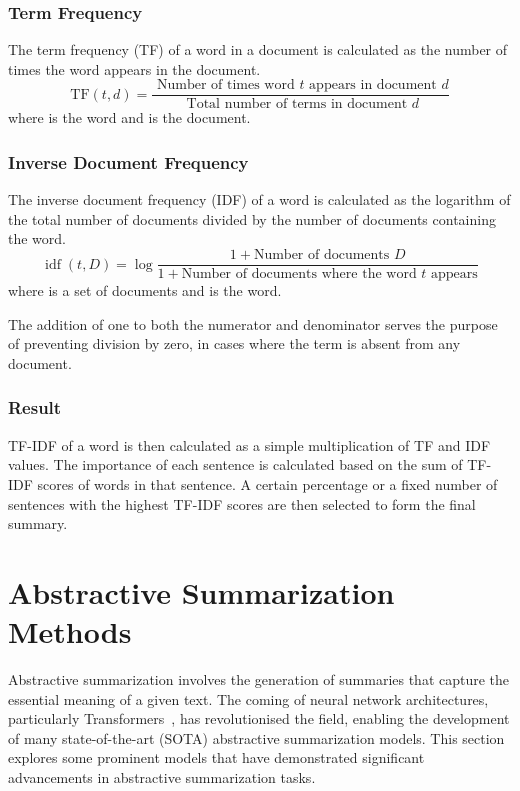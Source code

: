 \documentclass[english, ba, kiv, he, iso690numb, pdf, viewonly]{fasthesis}
\begin{document}
\subsubsection{Term Frequency}
The term frequency (TF) of a word in a document is calculated as the number of times the word appears in the document. 
$$
\mathrm{TF}(t, d)=\frac{\text { Number of times word } t \text { appears in document } d}{\text { Total number of terms in document } d}
$$
where  is the word and  is the document.

\subsubsection{Inverse Document Frequency}
The inverse document frequency (IDF) of a word is calculated as the logarithm of the total number of documents divided by the number of documents containing the word.
$$
\operatorname{idf}(t, D)=\log \frac{1 + \text{Number of documents } D}{1 + \text{Number of documents where the word } t \text{ appears}}
$$
where  is a set of documents and  is the word.

The addition of one to both the numerator and denominator serves the purpose of preventing division by zero, in cases where the term  is absent from any document.

\subsubsection{Result}
TF-IDF of a word  is then calculated as a simple multiplication of TF and IDF values. 
The importance of each sentence is calculated based on the sum of TF-IDF scores of words in that sentence. A certain percentage or a fixed number of sentences with the highest TF-IDF scores are then selected to form the final summary.

\section{Abstractive Summarization Methods}
Abstractive summarization involves the generation of summaries that capture the essential meaning of a given text. The coming of neural network architectures, particularly Transformers~\cite{vaswani2023attention}, has revolutionised the field, enabling the development of many state-of-the-art (SOTA) abstractive summarization models. This section explores some prominent models that have demonstrated significant advancements in abstractive summarization tasks.
\end{document}
